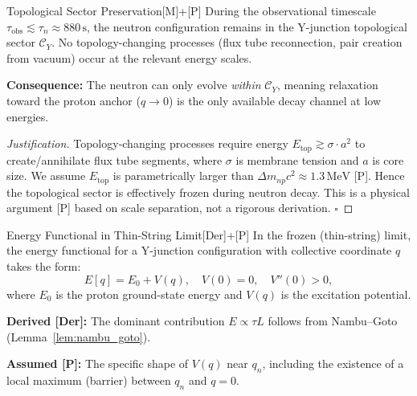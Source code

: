 \begin{edcLemmaBox}{Topological Sector Preservation}{[M]+[P]}
\label{lem:A1_topo_sector}
During the observational timescale $\tau_{\mathrm{obs}} \lesssim \tau_n \approx 880\,\mathrm{s}$,
the neutron configuration remains in the Y-junction topological sector $\mathcal{C}_Y$.
No topology-changing processes (flux tube reconnection, pair creation from vacuum)
occur at the relevant energy scales.

\textbf{Consequence:} The neutron can only evolve \emph{within} $\mathcal{C}_Y$, meaning
relaxation toward the proton anchor ($q \to 0$) is the only available decay channel
at low energies.
\end{edcLemmaBox}

\begin{proof}[Justification]
Topology-changing processes require energy $E_{\mathrm{top}} \gtrsim \sigma \cdot a^2$
to create/annihilate flux tube segments, where $\sigma$ is membrane tension and $a$ is
core size. We assume $E_{\mathrm{top}}$ is parametrically larger than
$\Delta m_{np} c^2 \approx 1.3\,\mathrm{MeV}$ [P]. Hence the topological sector is effectively frozen during neutron decay.
This is a physical argument [P] based on scale separation, not a rigorous derivation. \hfill $\square$
\end{proof}

\begin{edcLemmaBox}{Energy Functional in Thin-String Limit}{[Der]+[P]}
\label{lem:A2_energy_functional}
In the frozen (thin-string) limit, the energy functional for a Y-junction configuration
with collective coordinate $q$ takes the form:
\begin{equation}
\label{eq:energy_functional_q}
E[q] = E_0 + V(q), \quad V(0) = 0, \quad V''(0) > 0,
\end{equation}
where $E_0$ is the proton ground-state energy and $V(q)$ is the excitation potential.

\textbf{Derived [Der]:} The dominant contribution $E \propto \tau L$ follows from
Nambu--Goto (Lemma~\ref{lem:nambu_goto}).

\textbf{Assumed [P]:} The specific shape of $V(q)$ near $q_n$, including the existence
of a local maximum (barrier) between $q_n$ and $q = 0$.
\end{edcLemmaBox}

